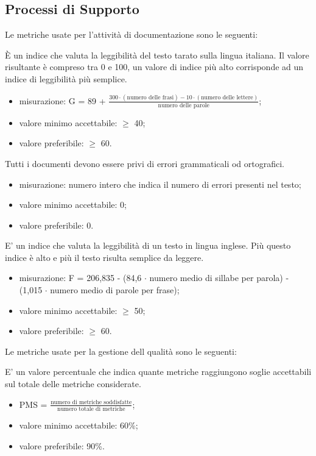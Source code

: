 \subsection{Processi di Supporto}

	Le metriche usate per l'attività di documentazione sono le seguenti:
	
		È un indice che valuta la leggibilità del testo tarato sulla lingua italiana. Il valore risultante è compreso tra 0 e 100, un valore di indice più alto corrisponde ad un indice di leggibilità più semplice.
		 \begin{itemize}
			\item{misurazione: G = 89 + $\displaystyle\frac{300 \cdot{} (\mbox{numero delle frasi}) - 10 \cdot{} (\mbox{numero delle lettere})}{\mbox{numero delle parole}}$;}
			\item{valore minimo accettabile: $\geq$ 40;}
			\item{valore preferibile: $\geq$ 60.}
		\end{itemize}

		Tutti i documenti devono essere privi di errori grammaticali od ortografici.
		\begin{itemize}
			\item{misurazione: numero intero che indica il numero di errori presenti nel testo;}
			\item{valore minimo accettabile: 0;}
			\item{valore preferibile: 0.}
		\end{itemize}
		
		E' un indice che valuta la leggibilità di un testo in lingua inglese. Più questo indice è alto e più il testo risulta semplice da leggere.
		 \begin{itemize}
			\item{misurazione: F = 206,835 - (84,6 $\cdot$ numero medio di sillabe per parola) - (1,015 $\cdot$ numero medio di parole per frase);}
			\item{valore minimo accettabile: $\geq$ 50;}
			\item{valore preferibile: $\geq$ 60.}
		\end{itemize}

	Le metriche usate per la gestione dell qualità sono le seguenti:
	
		E' un valore percentuale che indica quante metriche raggiungono soglie accettabili sul totale delle metriche considerate.
		\begin{itemize}
			\item{PMS = $\displaystyle\frac{\mbox{numero di metriche soddisfatte}}{\mbox{numero totale di metriche}}$;}
			\item{valore minimo accettabile: 60\%;}
			\item{valore preferibile: 90\%.}
		\end{itemize}
					
